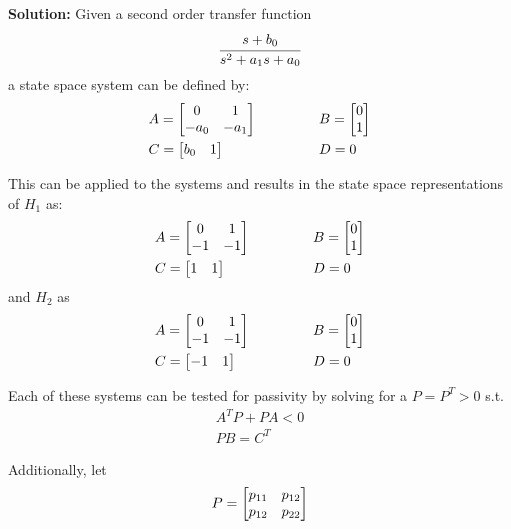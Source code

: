 \documentclass[letter]{article}
\begin{document}
\noindent
\textbf{Solution:}
Given a second order transfer function $$\cfrac{s + b_0}{s^2 + a_1 s + a_0}$$ a state space system can be defined by:
\begin{equation}
	\begin{aligned}
		&A = \mqty[0 &1\\ -a_0 &-a_1] \hspace{0.5in} &&B = \mqty[0\\ 1]\\
		&C = \mqty[b_0 & 1] \hspace{0.5in} &&D = 0
	\end{aligned}
\end{equation}

This can be applied to the systems and results in the state space representations of $H_1$ as:
\begin{equation}\label{eq:H_1}
	\begin{aligned}
		&A = \mqty[0 &1\\ -1 &-1] \hspace{0.5in} &&B = \mqty[0\\ 1]\\
		&C = \mqty[1 & 1] \hspace{0.5in} &&D = 0
	\end{aligned}
\end{equation}
and $H_2$ as
\begin{equation}\label{eq:H_2}
	\begin{aligned}
		&A = \mqty[0 &1\\ -1 &-1] \hspace{0.5in} &&B = \mqty[0\\ 1]\\
		&C = \mqty[-1 & 1] \hspace{0.5in} &&D = 0
	\end{aligned}
\end{equation}

Each of these systems can be tested for passivity by solving for a $P=P^T>0$ s.t.
\begin{align}
	A^T P + P A < 0\\
	PB = C^T
\end{align}

Additionally, let $$P = \mqty[p_{11} & p_{12}\\ p_{12} & p_{22}]$$
\end{document}
